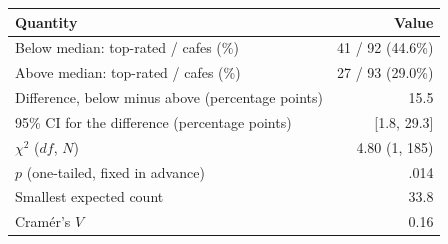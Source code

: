 \begin{tabular}{lr}
\toprule
Quantity & Value \\
\midrule
Below median: top-rated / cafes (\%) & 41 / 92 (44.6\%) \\
Above median: top-rated / cafes (\%) & 27 / 93 (29.0\%) \\
Difference, below minus above (percentage points) & 15.5 \\
95\% CI for the difference (percentage points) & [1.8, 29.3] \\
$\chi^2$ ($df$, $N$) & 4.80 (1, 185) \\
$p$ (one-tailed, fixed in advance) & .014 \\
Smallest expected count & 33.8 \\
Cram\'er's $V$ & 0.16 \\
\bottomrule
\end{tabular}
